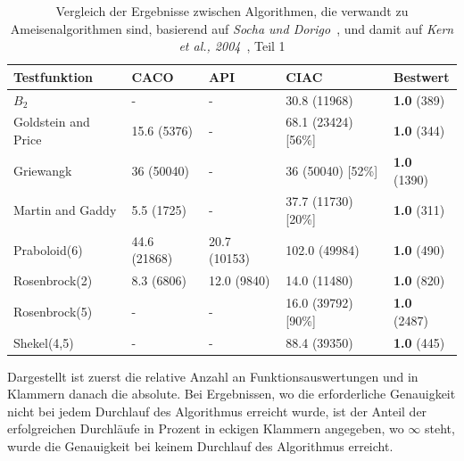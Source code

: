 \documentclass[fontsize=12, a4aper]{scrartcl}
\begin{document}
	\begin{table}[H]
		
		\caption{Vergleich der Ergebnisse zwischen Algorithmen, die verwandt zu Ameisenalgorithmen sind, basierend auf \textit{Socha und Dorigo}~\cite{socha2008ant}, und damit auf \textit{Kern et al., 2004}~\cite{kern2004learning}, Teil 1}
		
		\label{subsec:Vergleich_Von_ACO_R_Und_Iterationen_Von_ACO_R_Very_Simple:tab:Vergleich_Zu_Ameisen_Verwandte_Algorithmen_Teil_1}
		
		\scriptsize
		
		\begin{tabularx}{\linewidth}{X X X X X}
			
			\toprule
			
			Testfunktion & CACO & API & CIAC & Bestwert\\
			
			\midrule
			
			\(B_2\) & - & - & 30.8 (11968) & \textbf{1.0} (389)\\
			
			Goldstein and Price & 15.6 (5376) & - & 68.1 (23424) [56\%] & \textbf{1.0} (344)\\
			
			Griewangk & 36 (50040) & - & 36 (50040) [52\%]  & \textbf{1.0} (1390)\\
			
			Martin and Gaddy & 5.5 (1725) & - & 37.7 (11730) [20\%] & \textbf{1.0} (311)\\
			
			Praboloid(6) & 44.6 (21868) & 20.7 (10153) & 102.0 (49984) & \textbf{1.0} (490)\\
			
			Rosenbrock(2) & 8.3 (6806) & 12.0 (9840) & 14.0 (11480) & \textbf{1.0} (820)\\
			
			Rosenbrock(5) & - & - & 16.0 (39792) [90\%] & \textbf{1.0} (2487)\\
			
			Shekel(4,5) & - & - & 88.4 (39350) & \textbf{1.0} (445)\\
			
			\bottomrule
			
		\end{tabularx}
		
		\smallskip
		
		Dargestellt ist zuerst die relative Anzahl an Funktionsauswertungen und in Klammern danach die absolute. Bei Ergebnissen, wo die erforderliche Genauigkeit nicht bei jedem Durchlauf des Algorithmus erreicht wurde, ist der Anteil der erfolgreichen Durchläufe in Prozent in eckigen Klammern angegeben, wo \(\infty\) steht, wurde die Genauigkeit bei keinem Durchlauf des Algorithmus erreicht.\hfill\newline
		
	\end{table}
	
\end{document}

